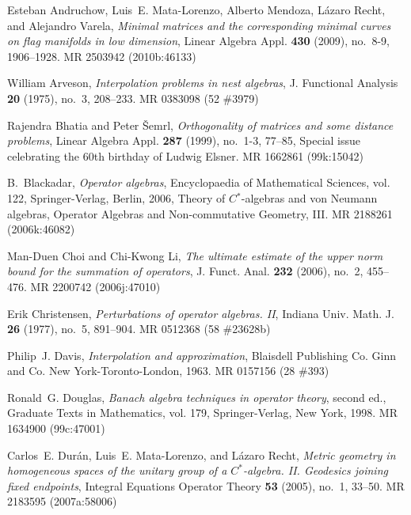 \documentclass[12pt]{amsart}
\newcommand{\<}{\langle}
\renewcommand{\>}{\rangle}
\theoremstyle{definition}   %
\begin{document}
\def\dbar{\leavevmode\hbox to 0pt{\hskip.2ex \accent"16\hss}d}
\providecommand{\bysame}{\leavevmode\hbox to3em{\hrulefill}\thinspace}
\providecommand{\MR}{\relax\ifhmode\unskip\space\fi MR }
\providecommand{\MRhref}[2]{%
  \href{http://www.ams.org/mathscinet-getitem?mr=#1}{#2}
}
\providecommand{\href}[2]{#2}
\begin{thebibliography}{99}


Esteban Andruchow, Luis~E. Mata-Lorenzo, Alberto Mendoza, L{\'a}zaro Recht, and
  Alejandro Varela, \emph{Minimal matrices and the corresponding minimal curves
  on flag manifolds in low dimension}, Linear Algebra Appl. \textbf{430}
  (2009), no.~8-9, 1906--1928. \MR{2503942 (2010b:46133)}

William Arveson, \emph{Interpolation problems in nest algebras}, J. Functional
  Analysis \textbf{20} (1975), no.~3, 208--233. \MR{0383098 (52 \#3979)}

Rajendra Bhatia and Peter {\v{S}}emrl, \emph{Orthogonality of matrices and some
  distance problems}, Linear Algebra Appl. \textbf{287} (1999), no.~1-3,
  77--85, Special issue celebrating the 60th birthday of Ludwig Elsner.
  \MR{1662861 (99k:15042)}

B.~Blackadar, \emph{Operator algebras}, Encyclopaedia of Mathematical Sciences,
  vol. 122, Springer-Verlag, Berlin, 2006, Theory of $C{^{*}}$-algebras and von
  Neumann algebras, Operator Algebras and Non-commutative Geometry, III.
  \MR{2188261 (2006k:46082)}

Man-Duen Choi and Chi-Kwong Li, \emph{The ultimate estimate of the upper norm
  bound for the summation of operators}, J. Funct. Anal. \textbf{232} (2006),
  no.~2, 455--476. \MR{2200742 (2006j:47010)}

Erik Christensen, \emph{Perturbations of operator algebras. {II}}, Indiana
  Univ. Math. J. \textbf{26} (1977), no.~5, 891--904. \MR{0512368 (58
  \#23628b)}

Philip~J. Davis, \emph{Interpolation and approximation}, Blaisdell Publishing
  Co. Ginn and Co. New York-Toronto-London, 1963. \MR{0157156 (28 \#393)}

Ronald~G. Douglas, \emph{Banach algebra techniques in operator theory}, second
  ed., Graduate Texts in Mathematics, vol. 179, Springer-Verlag, New York,
  1998. \MR{1634900 (99c:47001)}

Carlos~E. Dur{\'a}n, Luis~E. Mata-Lorenzo, and L{\'a}zaro Recht, \emph{Metric
  geometry in homogeneous spaces of the unitary group of a {$C^\ast$}-algebra.
  {II}. {G}eodesics joining fixed endpoints}, Integral Equations Operator
  Theory \textbf{53} (2005), no.~1, 33--50. \MR{2183595 (2007a:58006)}


\end{thebibliography}
\end{document}
